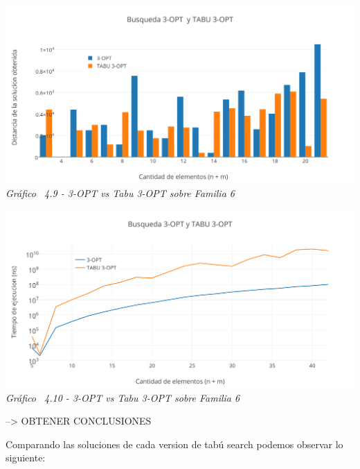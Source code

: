 \vspace*{0.3cm} \vspace*{0.3cm}
  \begin{center}
 \includegraphics[scale=0.5]{./EJ4/comparativorandom3opt.png}\\
 {            \textit{Gráfico \ 4.9 - 3-OPT vs Tabu 3-OPT sobre Familia 6}}
  \end{center}
  \vspace*{0.3cm}

\vspace*{0.3cm} \vspace*{0.3cm}
  \begin{center}
 \includegraphics[scale=0.5]{./EJ4/medicionrandom3opt.png}\\
 {            \textit{Gráfico \ 4.10 - 3-OPT vs Tabu 3-OPT sobre Familia 6}}
  \end{center}
  \vspace*{0.3cm}
  
--> OBTENER CONCLUSIONES
  
Comparando las soluciones de cada version de tabú search podemos observar lo siguiente: 

